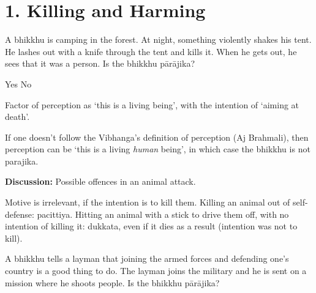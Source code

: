 \chapter{1. Killing and Harming}
\renewcommand*{\theChapterTitle}{1. Killing and Harming}

\begin{exam}{\autoExamName}

\begin{problem*}

  \begin{parts}

  \item A bhikkhu is camping in the forest. At night, something violently shakes
    his tent. He lashes out with a knife through the tent and kills it. When he
    gets out, he sees that it was a person. Is the bhikkhu pārājika?

    \bigskip

    \begin{answers}{2}
      \bChoices
       Yes\eAns
       No\eAns
      \eChoices
    \end{answers}

    \bigskip

    \begin{solution}
      Factor of perception as `this is a living being', with the intention of
      `aiming at death'.

      If one doesn't follow the Vibhanga's definition of perception (Aj
      Brahmali), then perception can be `this is a living \emph{human} being',
      in which case the bhikkhu is not parajika.
    \end{solution}

    \textbf{Discussion:} Possible offences in an animal attack.

    \begin{solution}
      Motive is irrelevant, if the intention is to kill them. Killing an animal
      out of self-defense: pacittiya. Hitting an animal with a stick to drive
      them off, with no intention of killing it: dukkata, even if it dies as a
      result (intention was not to kill).
    \end{solution}

    \bigskip

  \item A bhikkhu tells a layman that joining the armed forces and defending
    one's country is a good thing to do. The layman joins the military and he is
    sent on a mission where he shoots people. Is the bhikkhu pārājika?


\end{parts}
\end{problem*}
\end{exam}
